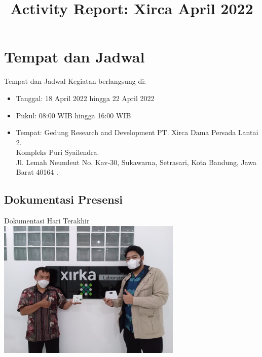 \documentclass[table,dvipsnames]{beamer}
\title[Xirca042022]{Activity Report: Xirca April 2022}
\author{}
\institute[VibrasticLab : \ccbysa]{
	Achmadi ST MT
}
\date{}
\begin{document}
    \begin{frame}
        \titlepage
    \end{frame}

	\section{Tempat dan Jadwal}
	\begin{frame}
		\begin{exampleblock}{Tempat dan Jadwal}
			Kegiatan berlangsung di:
			\begin{itemize}
				\item Tanggal: 18 April 2022 hingga 22 April 2022
				\item Pukul: 08:00 WIB hingga 16:00 WIB
				\item Tempat: Gedung Research and Development PT. Xirca Dama Persada Lantai 2.\\
				Kompleks Puri Syailendra.\\
				Jl. Lemah Neundeut No. Kav-30, Sukawarna, Setrasari, Kota Bandung, Jawa Barat 40164 .
			\end{itemize}
		\end{exampleblock}
	\end{frame}

	\begin{frame}
		\subsection{Dokumentasi Presensi}
		\begin{exampleblock}{Dokumentasi Hari Terakhir}
			\centering
			\includegraphics[width=250pt]{images/last_day}
		\end{exampleblock}
	\end{frame}
\end{document}
